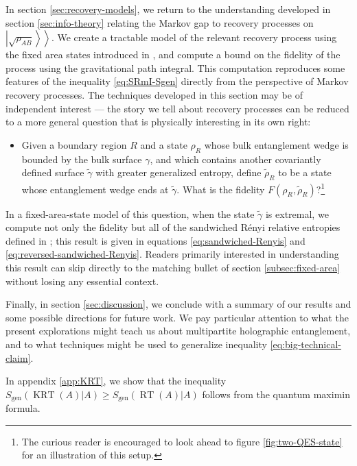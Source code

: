 \documentclass[a4paper,11pt]{article}
\renewcommand{\tilde}{\widetilde}
\newcommand{\RT}{\operatorname{RT}}
\newcommand{\KRT}{\operatorname{KRT}}
\newcommand{\kett}[1]{\left.\left| #1 \right\rangle \right\rangle}
\begin{document}
In section \ref{sec:recovery-models}, we return to the understanding developed in section \ref{sec:info-theory} relating the Markov gap to recovery processes on $\kett{\sqrt{\rho_{AB}}}$. We create a tractable model of the relevant recovery process using the fixed area states introduced in \cite{fixed-area-AR, fixed-area-DHM}, and compute a bound on the fidelity of the process using the gravitational path integral. This computation reproduces some features of the inequality \eqref{eq:SRmI-Sgen} directly from the perspective of Markov recovery processes. The techniques developed in this section may be of independent interest --- the story we tell about recovery processes can be reduced to a more general question that is physically interesting in its own right:
\begin{itemize}
    \item Given a boundary region $R$ and a state $\rho_{R}$ whose bulk entanglement wedge is bounded by the bulk surface $\gamma$, and which contains another covariantly defined surface $\tilde{\gamma}$ with greater generalized entropy, define $\tilde{\rho}_{R}$ to be a state whose entanglement wedge ends at $\tilde{\gamma}$. What is the fidelity $F(\rho_R, \tilde{\rho}_{R})$?\footnote{The curious reader is encouraged to look ahead to figure \ref{fig:two-QES-state} for an illustration of this setup.}
\end{itemize} 
In a fixed-area-state model of this question, when the state $\tilde{\gamma}$ is extremal, we compute not only the fidelity but all of the sandwiched R\'{e}nyi relative entropies defined in \cite{muller-lennert_quantum_2013, wilde_strong_2014}; this result is given in equations \eqref{eq:sandwiched-Renyis} and \eqref{eq:reversed-sandwiched-Renyis}. Readers primarily interested in understanding this result can skip directly to the matching bullet of section \ref{subsec:fixed-area} without losing any essential context.

Finally, in section \ref{sec:discussion}, we conclude with a summary of our results and some possible directions for future work. We pay particular attention to what the present explorations might teach us about multipartite holographic entanglement, and to what techniques might be used to generalize inequality \eqref{eq:big-technical-claim}.

In appendix \ref{app:KRT}, we show that the inequality $S_{\text{gen}}(\KRT(A)|A) \geq S_{\text{gen}}(\RT(A)|A)$ follows from the quantum maximin formula.
\end{document}
